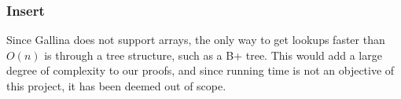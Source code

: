 \subsubsection{Insert}
Since Gallina does not support arrays, the only way to get lookups faster than $O(n)$ is through a tree structure, such as a B+ tree. This would add a large degree of complexity to our proofs, and since running time is not an objective of this project, it has been deemed out of scope.

\paragraph{}
